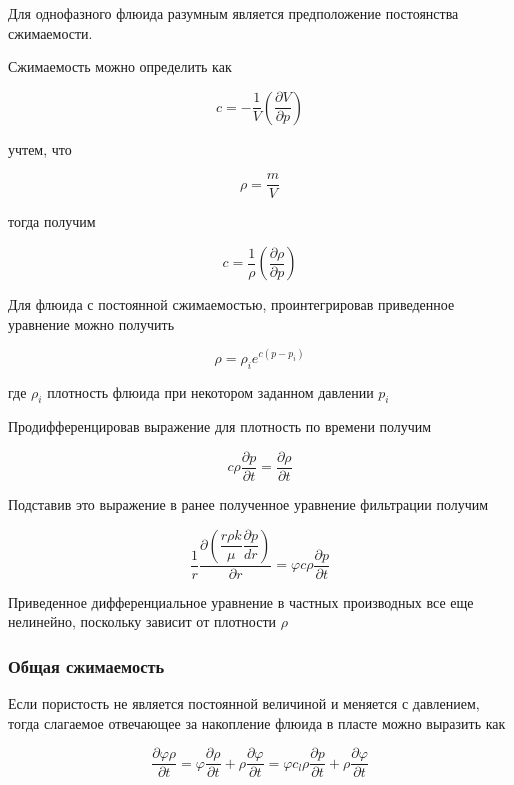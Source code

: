 Для однофазного флюида разумным является предположение постоянства сжимаемости.

Сжимаемость можно определить как 

\begin{equation} \label{eq:compressibility_definition_1}
c=-\frac{1}{V} \left(  \frac{ \partial V}{ \partial p}  \right) 
\end{equation}

учтем, что

$$ \rho = \frac{m}{V} $$  

тогда получим


\begin{equation} \label{eq:compressibility_definition_2}
c=\frac{1}{\rho} \left(  \frac{ \partial \rho}{ \partial p}  \right) 
\end{equation} 

Для флюида с постоянной сжимаемостью, проинтегрировав приведенное уравнение можно получить 

$$\rho = \rho_i e^{c(p-p_i)}$$

где $\rho_i$ плотность флюида при некотором заданном давлении $p_i$

Продифференцировав выражение для плотность по времени получим 

$$
c \rho \frac{\partial p}{\partial t} = \frac{\partial \rho}{\partial t}
$$

Подставив это выражение в ранее полученное уравнение фильтрации получим 


\begin{equation} \label{eq:diff_eq_3} 
\frac{1}{r}\frac{\partial\left( \dfrac{r\rho k}{\mu}\dfrac{\partial p}{dr}\right)}{\partial r}=\varphi c \rho \frac{\partial p}{\partial t}  
\end{equation} 

Приведенное дифференциальное уравнение в частных производных все еще нелинейно, поскольку зависит от плотности $\rho$ 



\subsubsection{Общая сжимаемость}
Если пористость не является постоянной величиной и меняется с давлением, тогда  слагаемое отвечающее за накопление флюида в пласте можно выразить как 


$$\frac{\partial \varphi \rho}{\partial t} = \varphi \frac{\partial \rho}{\partial t}+ \rho \frac{\partial \varphi }{\partial t} = \varphi c_l \rho \frac{\partial p}{\partial t} + \rho \frac{\partial \varphi }{\partial t}  $$

